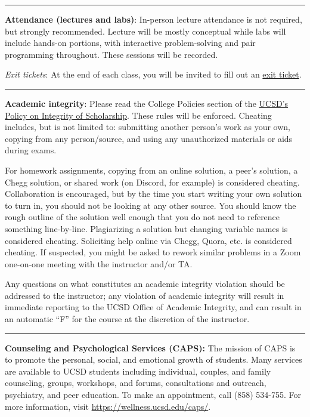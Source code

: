 \documentclass[12pt]{article}
\begin{document}
\begin{center}
  \rule{\textwidth}{0.5pt}
\end{center}

\noindent\textbf{Attendance (lectures and labs)}: In-person lecture attendance is not required, but strongly recommended.
Lecture will be mostly conceptual while labs will include hands-on portions, with interactive problem-solving and pair programming throughout.
These sessions will be recorded.

\emph{Exit tickets}: At the end of each class, you will be invited to fill out an \href{https://forms.gle/b7ZDZRm1czrnHaGBA}{exit ticket}.

\begin{center}
  \rule{\textwidth}{0.5pt}
\end{center}

\noindent\textbf{Academic integrity}: Please read the College Policies section of the \href{http://senate.ucsd.edu/Operating-Procedures/Senate-Manual/Appendices/2}{UCSD’s Policy on Integrity of Scholarship}.
These rules will be enforced.
Cheating includes, but is not limited to: submitting another person's work as your own, copying from any person/source, and using any unauthorized materials or aids during exams.

For homework assignments, copying from an online solution, a peer's solution, a Chegg solution, or shared work (on Discord, for example) is considered cheating.
Collaboration is encouraged, but by the time you start writing your own solution to turn in, you should not be looking at any other source.
You should know the rough outline of the solution well enough that you do not need to reference something line-by-line.
Plagiarizing a solution but changing variable names is considered cheating.
Soliciting help online via Chegg, Quora, etc. is considered cheating.
If suspected, you might be asked to rework similar problems in a Zoom one-on-one meeting with the instructor and/or TA.

Any questions on what constitutes an academic integrity violation should be addressed to the instructor; any violation of academic integrity will result in immediate reporting to the UCSD Office of Academic Integrity, and can result in an automatic ``F'' for the course at the discretion of the instructor.

\begin{center}
  \rule{\textwidth}{0.5pt}
\end{center}

\noindent\textbf{Counseling and Psychological Services (CAPS):} The mission of CAPS is to promote the personal, social, and emotional growth of students.
Many services are available to UCSD students including individual, couples, and family counseling, groups, workshops, and forums, consultations and outreach, psychiatry, and peer education.
To make an appointment, call (858) 534-755.
For more information, visit \href{https://wellness.ucsd.edu/caps/}{https://wellness.ucsd.edu/caps/}.
\end{document}
